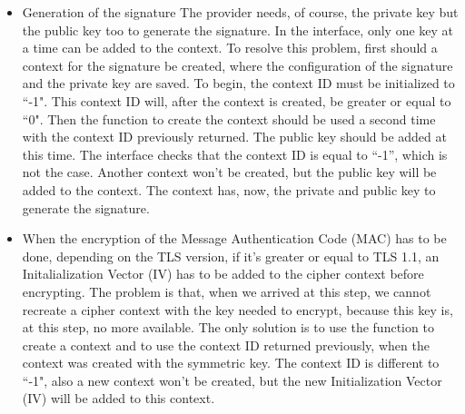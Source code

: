 \begin{itemize}
  \item Generation of the signature\newline
  The provider needs, of course, the private key but the public key too to
  generate the signature. In the interface, only one key at a time can be added
  to the context.
  To resolve this problem, first should a context for the
  signature be created, where the configuration of the signature and the private
  key are saved. To begin, the context ID must be initialized to ``-1". This
  context ID will, after the context is created, be greater or equal to ``0".
  Then the function to create the context should be used a second time with the context
  ID previously returned. The public key should be added at this time. The
  interface checks that the context ID is equal to ``-1'', which is not the
  case. Another context won't be created, but the public key will be added to
  the context. The context has, now, the private and public key to generate
  the signature.
  \item When the encryption of the Message Authentication Code (MAC) has to be
  done, depending on the TLS version, if it's greater or equal to TLS 1.1, an
  Initalialization Vector (IV) has to be added to the cipher context before
  encrypting.
  The problem is that, when we arrived at this step, we cannot recreate a cipher
  context with the key needed to encrypt, because this key is, at this step,
  no more available. The only solution is to use the function to create a
  context and to use the context ID returned previously, when the context was
  created with the symmetric key. The context ID is different to ``-1", also a
  new context won't be created, but the new Initialization Vector (IV)
  \cite{wiki:iv} will be added to this context.
\end{itemize}